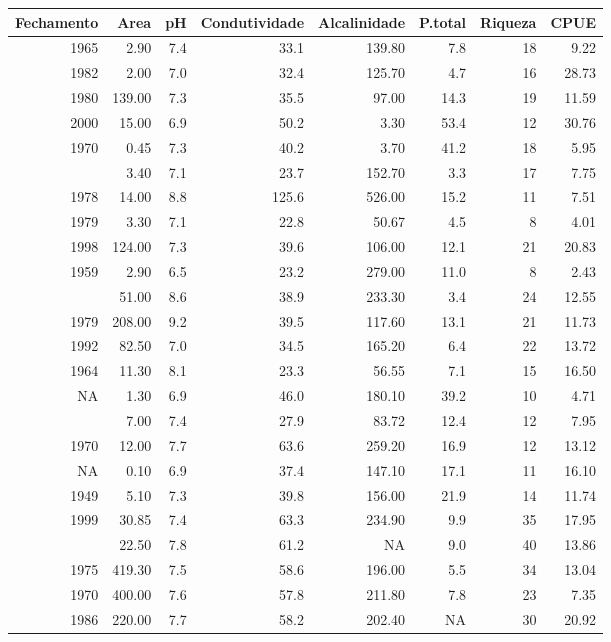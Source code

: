 \documentclass[
]{book}
\begin{document}
\begin{table}
\centering\begingroup\fontsize{8}{10}\selectfont

\begin{tabular}{rrrrrrrr}
\toprule
Fechamento & Area & pH & Condutividade & Alcalinidade & P.total & Riqueza & CPUE\\
\midrule
1965 & 2.90 & 7.4 & 33.1 & 139.80 & 7.8 & 18 & 9.22\\
1982 & 2.00 & 7.0 & 32.4 & 125.70 & 4.7 & 16 & 28.73\\
1980 & 139.00 & 7.3 & 35.5 & 97.00 & 14.3 & 19 & 11.59\\
2000 & 15.00 & 6.9 & 50.2 & 3.30 & 53.4 & 12 & 30.76\\
1970 & 0.45 & 7.3 & 40.2 & 3.70 & 41.2 & 18 & 5.95\\
\addlinespace
1996 & 3.40 & 7.1 & 23.7 & 152.70 & 3.3 & 17 & 7.75\\
1978 & 14.00 & 8.8 & 125.6 & 526.00 & 15.2 & 11 & 7.51\\
1979 & 3.30 & 7.1 & 22.8 & 50.67 & 4.5 & 8 & 4.01\\
1998 & 124.00 & 7.3 & 39.6 & 106.00 & 12.1 & 21 & 20.83\\
1959 & 2.90 & 6.5 & 23.2 & 279.00 & 11.0 & 8 & 2.43\\
\addlinespace
1975 & 51.00 & 8.6 & 38.9 & 233.30 & 3.4 & 24 & 12.55\\
1979 & 208.00 & 9.2 & 39.5 & 117.60 & 13.1 & 21 & 11.73\\
1992 & 82.50 & 7.0 & 34.5 & 165.20 & 6.4 & 22 & 13.72\\
1964 & 11.30 & 8.1 & 23.3 & 56.55 & 7.1 & 15 & 16.50\\
NA & 1.30 & 6.9 & 46.0 & 180.10 & 39.2 & 10 & 4.71\\
\addlinespace
1957 & 7.00 & 7.4 & 27.9 & 83.72 & 12.4 & 12 & 7.95\\
1970 & 12.00 & 7.7 & 63.6 & 259.20 & 16.9 & 12 & 13.12\\
NA & 0.10 & 6.9 & 37.4 & 147.10 & 17.1 & 11 & 16.10\\
1949 & 5.10 & 7.3 & 39.8 & 156.00 & 21.9 & 14 & 11.74\\
1999 & 30.85 & 7.4 & 63.3 & 234.90 & 9.9 & 35 & 17.95\\
\addlinespace
1992 & 22.50 & 7.8 & 61.2 & NA & 9.0 & 40 & 13.86\\
1975 & 419.30 & 7.5 & 58.6 & 196.00 & 5.5 & 34 & 13.04\\
1970 & 400.00 & 7.6 & 57.8 & 211.80 & 7.8 & 23 & 7.35\\
1986 & 220.00 & 7.7 & 58.2 & 202.40 & NA & 30 & 20.92\\

\end{tabular}
\end{table}
\end{document}
